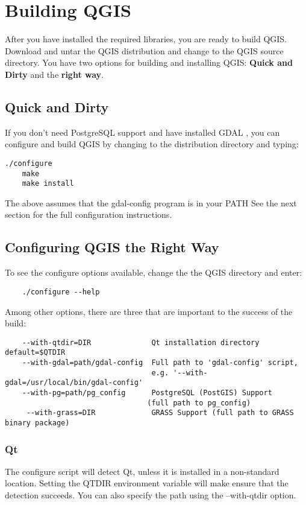 \documentclass[a4paper,10pt]{article}
\begin{document}
 \section{Building QGIS}
  
  After you have installed the required libraries, you are ready to build QGIS. Download and untar the QGIS distribution and change to the QGIS source directory. You have two options for building and installing QGIS: \textbf{Quick and Dirty} and the \textbf{right way}.
  \subsection{Quick and Dirty}
  If you don't need PostgreSQL support and have installed GDAL ,
  you can configure and build QGIS by changing to the distribution directory
  and typing:
  \begin{verbatim}./configure
    make
    make install
  \end{verbatim}
  The above assumes that the gdal-config program is in your PATH
  See the next section for the full configuration instructions.
  \subsection{Configuring QGIS the Right Way}
  To see the configure options available, change the the QGIS 
  directory and enter:
  \begin{verbatim}
    ./configure --help
   \end{verbatim}
  Among other options, there are three that are important to
  the success of the build:
  \begin{verbatim}
    --with-qtdir=DIR              Qt installation directory default=$QTDIR
    --with-gdal=path/gdal-config  Full path to 'gdal-config' script,
                                  e.g. '--with-gdal=/usr/local/bin/gdal-config'
    --with-pg=path/pg_config      PostgreSQL (PostGIS) Support
                                 (full path to pg_config)
     --with-grass=DIR             GRASS Support (full path to GRASS binary package)

  \end{verbatim}

  \subsubsection{Qt}
  The configure script will detect Qt, unless it is installed in a
  non-standard location. Setting the QTDIR environment variable will 
  make ensure that the detection succeeds. You can also specify the
  path using the --with-qtdir option. 
\end{document}
